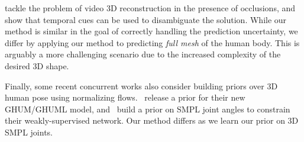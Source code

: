 
\citet{cheng19occlusion-aware} tackle the problem of video 3D reconstruction in the presence of occlusions, and show that temporal cues can be used to disambiguate the solution.
While our method is similar in the goal of correctly handling the prediction uncertainty, we differ by applying our method to predicting \emph{full mesh} of the human body.
This is arguably a more challenging scenario due to the increased complexity of the desired 3D shape.

Finally, some recent concurrent works also consider building priors over 3D human pose using normalizing flows.~\citet{xu-2020-cvpr} release a prior for their new GHUM/GHUML model, and~\citet{weakly-supervised-normflow} build a prior on SMPL joint angles to constrain their weakly-supervised network. Our method differs as we learn our prior on 3D SMPL joints.


